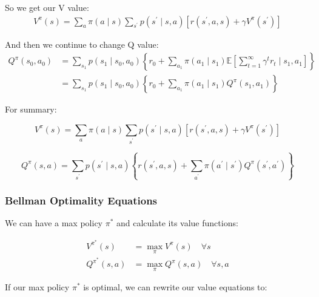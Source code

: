 \documentclass[11pt]{article}
\begin{document}
So we get our V value:
\begin{align*}
V^{\pi}(s)=\sum_{a} \pi(a \mid s) \sum_{s^{\prime}} p\left(s^{\prime} \mid s, a\right)\left[r\left(s^{\prime}, a, s\right)+\gamma V^{\pi}\left(s^{\prime}\right)\right]
\end{align*}

And then we continue to change Q value:
\begin{align*}
Q^{\pi}\left(s_{0}, a_{0}\right) &=\sum_{s_{1}} p\left(s_{1} \mid s_{0}, a_{0}\right)\left\{r_{0}+\sum_{a_{1}} \pi\left(a_{1} \mid s_{1}\right) \mathbb{E}\left[\sum_{t=1}^{\infty} \gamma^{t} r_{t} \mid s_{1}, a_{1}\right]\right\} \\
&=\sum_{s_{1}} p\left(s_{1} \mid s_{0}, a_{0}\right)\left\{r_{0}+\sum_{a_{1}} \pi\left(a_{1} \mid s_{1}\right) Q^{\pi}\left(s_{1}, a_{1}\right)\right\}
\end{align*}

For summary:

\begin{equation}
V^{\pi}(s) =\sum_{a} \pi(a \mid s) \sum_{s^{\prime}} p\left(s^{\prime} \mid s, a\right)\left[r\left(s^{\prime}, a, s\right)+\gamma V^{\pi}\left(s^{\prime}\right)\right]
\end{equation}

\begin{equation}
Q^{\pi}(s, a) =\sum_{s^{\prime}} p\left(s^{\prime} \mid s, a\right)\left\{r\left(s^{\prime}, a, s\right)+\sum_{a^{\prime}} \pi\left(a^{\prime} \mid s^{\prime}\right) Q^{\pi}\left(s^{\prime}, a^{\prime}\right)\right\}
\end{equation}


\subsubsection{Bellman Optimality Equations}

We can have a max policy $\pi^*$ and calculate its value functions:

\begin{equation}
\begin{array}{rlr}
V^{\pi^{*}}(s) & =\max _{\pi} V^{\pi}(s) \quad \forall s \\
Q^{\pi^{*}}(s, a) & =\max _{\pi} Q^{\pi}(s, a) \quad \forall s, a
\end{array}
\end{equation}

If our max policy $\pi^*$ is optimal, we can rewrite our value equations to:
\end{document}
